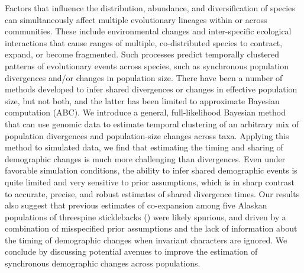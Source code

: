 Factors that influence the distribution, abundance, and
diversification of species can simultaneously affect multiple evolutionary
lineages within or across communities.
These include environmental changes and inter-specific ecological interactions
that cause ranges of multiple, co-distributed species to contract,
expand, or become fragmented.
Such processes predict temporally clustered patterns of evolutionary events
across species, such as synchronous population divergences and/or changes in
population size.
There have been a number of methods developed to infer shared divergences or
changes in effective population size, but not both, and the latter has been
limited to approximate Bayesian computation (ABC).
We introduce a general, full-likelihood Bayesian method that can use genomic
data to estimate temporal clustering of an arbitrary mix of population
divergences and population-size changes across taxa.
Applying this method to simulated data,
we find that estimating the timing and sharing of demographic changes is much
more challenging than divergences.
Even under favorable simulation conditions, the ability to infer shared
demographic events is quite limited and very sensitive to prior assumptions,
which is in sharp contrast to accurate, precise, and robust estimates of shared
divergence times.
Our results also suggest that previous estimates of co-expansion among five
Alaskan populations of threespine sticklebacks ()
were likely spurious, and driven by a combination of misspecified prior
assumptions and the lack of information about the timing of demographic changes
when invariant characters are ignored.
We conclude by discussing potential avenues to improve the estimation of
synchronous demographic changes across populations.
